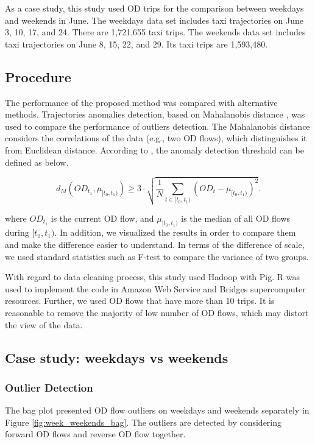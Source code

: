 \documentclass[a4paper,UKenglish]{lipics-v2016}
\begin{document}
As a case study, this study used OD trips for the comparison between weekdays and weekends in June. The weekdays data set includes taxi trajectories on June 3, 10, 17, and 24. There are 1,721,655 taxi trips. The weekends data set includes taxi trajectories on June 8, 15, 22, and 29.  Its taxi trips are 1,593,480. 

\subsection{Procedure}

The performance of the proposed method was compared with alternative methods. Trajectories anomalies detection, based on Mahalanobis distance \cite{pan13ACMSigspatial},  was used to compare the performance of outliers detection. The Mahalanobis distance considers the correlations of the data (e.g., two OD flows), which distinguishes it from Euclidean distance. According to \cite{pan13ACMSigspatial}, the anomaly detection threshold can be defined as below.

\begin{equation*}
d_M(OD_{t_1}, \mu_{[t_0,t_1)}) \geq 3\cdot \sqrt{\frac{1}{N}\sum_{t \in [t_0,t_1)} (OD_{t} - \mu_{[t_0,t_1)})^2} .
\end{equation*}

where $OD_{t_1}$ is the current OD flow, and $\mu_{[t_0,t_1)}$ is the median of all OD flows during $[t_0,t_1)$. In addition, we visualized the results in order to compare them and make the difference easier to understand. In terms of the difference of scale, we used standard statistics such as F-test to compare the variance of two groups.   

With regard to data cleaning process, this study used Hadoop with Pig. R was used to implement the code in Amazon Web Service  and Bridges supercomputer resources. Further, we used OD flows that have more than 10 trips. It is reasonable to remove the majority of low number of OD flows, which may distort the view of the data. 



\subsection{Case study: weekdays vs weekends}
\subsubsection{Outlier Detection}
The bag plot presented OD flow outliers on weekdays and weekends separately in Figure \ref{fig:week_weekends_bag}. The outliers are detected by considering forward OD flows and reverse OD flow together. 
\end{document}
